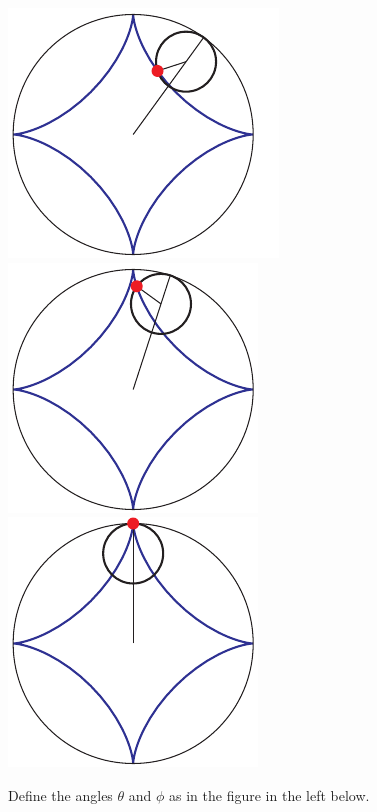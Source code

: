 \begin{wfig}
\begin{center}
\end{center}
\begin{center}
     \includegraphics{astroid1DD.pdf}\quad
     \includegraphics{astroid1EE.pdf}\quad
     \includegraphics{astroid1FF.pdf}
\end{center}
\end{wfig}
Define the angles $\theta$ and $\phi$ as
in the figure in the left below.
